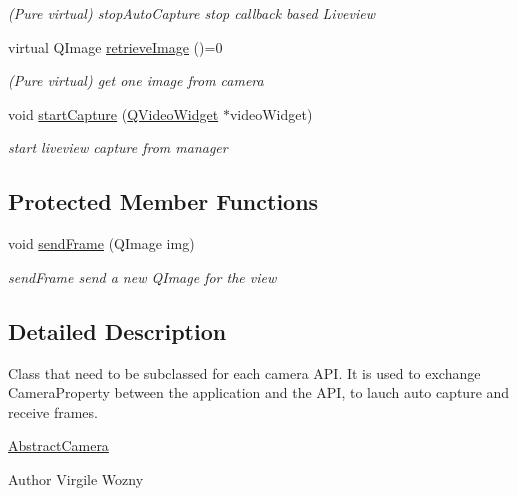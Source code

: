 \begin{DoxyCompactItemize}
\begin{DoxyCompactList}\small\item\em (Pure virtual) stop\-Auto\-Capture stop callback based Liveview \end{DoxyCompactList}\item 
virtual Q\-Image \hyperlink{class_abstract_camera_aec58ab298b618632fd422cadd11bae17}{retrieve\-Image} ()=0
\begin{DoxyCompactList}\small\item\em (Pure virtual) get one image from camera \end{DoxyCompactList}\item 
void \hyperlink{class_abstract_camera_a19c1e4a98de744a5b8567b4764ceabe0}{start\-Capture} (\hyperlink{class_q_video_widget}{Q\-Video\-Widget} $\ast$video\-Widget)
\begin{DoxyCompactList}\small\item\em start liveview capture from manager \end{DoxyCompactList}\end{DoxyCompactItemize}
\subsection*{Protected Member Functions}
\begin{DoxyCompactItemize}
\item 
void \hyperlink{class_abstract_camera_a8fa5df9ffe74c0df6e1b8d74b6bf3b9d}{send\-Frame} (Q\-Image img)
\begin{DoxyCompactList}\small\item\em send\-Frame send a new Q\-Image for the view \end{DoxyCompactList}\end{DoxyCompactItemize}


\subsection{Detailed Description}
Class that need to be subclassed for each camera A\-P\-I. It is used to exchange Camera\-Property between the application and the A\-P\-I, to lauch auto capture and receive frames. 

\hyperlink{class_abstract_camera}{Abstract\-Camera} \begin{DoxyAuthor}{Author}
Virgile Wozny 
\end{DoxyAuthor}


